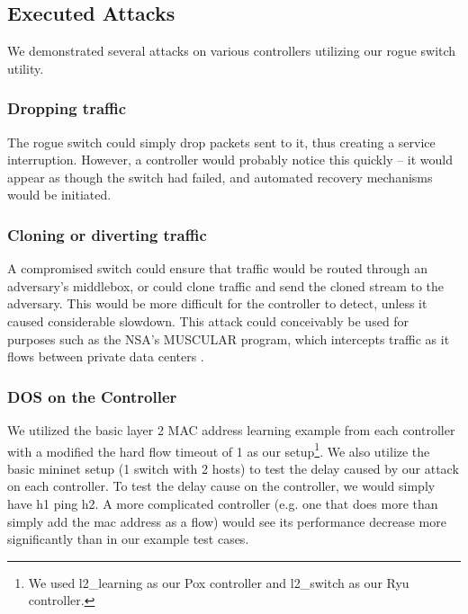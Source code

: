 
\subsection{Executed Attacks} 

We demonstrated several attacks on various controllers utilizing our rogue switch utility. 
   
\subsubsection{Dropping traffic}
The rogue switch could simply drop packets sent to it, thus creating a service interruption. However, a controller would probably notice this quickly -- it would appear as though the switch had failed, and automated recovery mechanisms would be initiated.

\subsubsection{Cloning or diverting traffic}
A compromised switch could ensure that traffic would be routed through an adversary's middlebox, or could clone traffic and send the cloned stream to the adversary. This would be more difficult for the controller to detect, unless it caused considerable slowdown. This attack could conceivably be used for purposes such as the NSA's MUSCULAR program, which intercepts traffic as it flows between private data centers \cite{muscular}. 

\subsubsection{DOS on the Controller}
We utilized the basic layer 2 MAC address learning example from each controller with a modified the hard flow timeout of 1 as our setup\footnote{We used l2\_learning as our Pox controller and l2\_switch as our Ryu controller.}. We also utilize the basic mininet setup (1 switch with 2 hosts) to test the delay caused by our attack on each controller. To test the delay cause on the controller, we would simply have h1 ping h2. A more complicated controller (e.g. one that does more than simply add the mac address as a flow) would see its performance decrease more significantly than in our example test cases.

